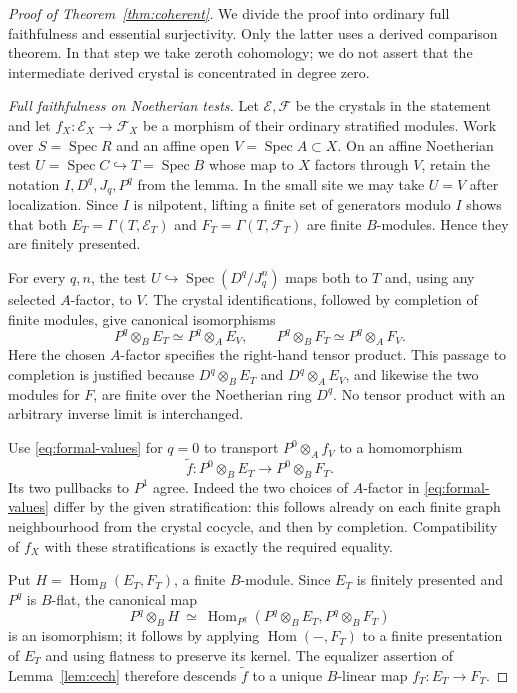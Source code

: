 \documentclass[11pt]{article}
\DeclareMathOperator{\Spec}{Spec}\DeclareMathOperator{\Hom}{Hom}
\theoremstyle{definition}\newtheorem{definition}[theorem]{Definition}
\theoremstyle{remark}\newtheorem{remark}[theorem]{Remark}
\begin{document}
\begin{proof}[Proof of Theorem~\ref{thm:coherent}]
We divide the proof into ordinary full faithfulness and essential surjectivity.  Only the latter uses a derived comparison theorem.  In that step we take zeroth cohomology; we do not assert that the intermediate derived crystal is concentrated in degree zero.

\emph{Full faithfulness on Noetherian tests.}
Let $\mathcal E,\mathcal F$ be the crystals in the statement and let
$f_X:\mathcal E_X\to\mathcal F_X$ be a morphism of their ordinary stratified modules.  Work over $S=\Spec R$ and an affine open $V=\Spec A\subset X$.  On an affine Noetherian test $U=\Spec C\hookrightarrow T=\Spec B$ whose map to $X$ factors through $V$, retain the notation $I,D^q,J_q,P^q$ from the lemma.  In the small site we may take $U=V$ after localization.  Since $I$ is nilpotent, lifting a finite set of generators modulo $I$ shows that both $E_T=\Gamma(T,\mathcal E_T)$ and $F_T=\Gamma(T,\mathcal F_T)$ are finite $B$-modules.  Hence they are finitely presented.

For every $q,n$, the test $U\hookrightarrow\Spec(D^q/J_q^n)$ maps both to $T$ and, using any selected $A$-factor, to $V$.  The crystal identifications, followed by completion of finite modules, give canonical isomorphisms
\begin{equation}\label{eq:formal-values}
 P^q\otimes_BE_T\simeq P^q\otimes_AE_V,\qquad
 P^q\otimes_BF_T\simeq P^q\otimes_AF_V.
\end{equation}
Here the chosen $A$-factor specifies the right-hand tensor product.  This passage to completion is justified because $D^q\otimes_BE_T$ and $D^q\otimes_AE_V$, and likewise the two modules for $F$, are finite over the Noetherian ring $D^q$.  No tensor product with an arbitrary inverse limit is interchanged.

Use \eqref{eq:formal-values} for $q=0$ to transport $P^0\otimes_Af_V$ to a homomorphism
\[
                 \widetilde f:P^0\otimes_BE_T\longrightarrow P^0\otimes_BF_T.
\]
Its two pullbacks to $P^1$ agree.  Indeed the two choices of $A$-factor in \eqref{eq:formal-values} differ by the given stratification: this follows already on each finite graph neighbourhood from the crystal cocycle, and then by completion.  Compatibility of $f_X$ with these stratifications is exactly the required equality.

Put $H=\Hom_B(E_T,F_T)$, a finite $B$-module.  Since $E_T$ is finitely presented and $P^q$ is $B$-flat, the canonical map
\[
 P^q\otimes_BH\ \simeq\
 \Hom_{P^q}(P^q\otimes_BE_T,P^q\otimes_BF_T)
\]
is an isomorphism; it follows by applying $\Hom(-,F_T)$ to a finite presentation of $E_T$ and using flatness to preserve its kernel.  The equalizer assertion of Lemma~\ref{lem:cech} therefore descends $\widetilde f$ to a unique $B$-linear map $f_T:E_T\to F_T$.


\end{proof}
\end{document}
